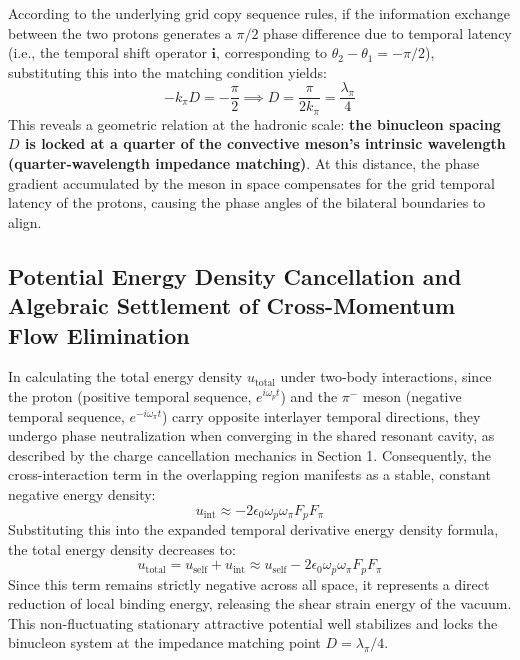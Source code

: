 \documentclass[12pt, a4paper]{article}
\begin{document}
According to the underlying grid copy sequence rules, if the information exchange between the two protons generates a $\pi/2$ phase difference due to temporal latency (i.e., the temporal shift operator $\mathbf{i}$, corresponding to $\theta_2 - \theta_1 = -\pi/2$), substituting this into the matching condition yields:
\begin{equation}
-k_\pi D = -\frac{\pi}{2} \implies D = \frac{\pi}{2 k_\pi} = \frac{\lambda_\pi}{4}
\end{equation}
This reveals a geometric relation at the hadronic scale: \textbf{the binucleon spacing $D$ is locked at a quarter of the convective meson's intrinsic wavelength (quarter-wavelength impedance matching)}. At this distance, the phase gradient accumulated by the meson in space compensates for the grid temporal latency of the protons, causing the phase angles of the bilateral boundaries to align.

\subsection{Potential Energy Density Cancellation and Algebraic Settlement of Cross-Momentum Flow Elimination}

In calculating the total energy density $u_{\mathrm{total}}$ under two-body interactions, since the proton (positive temporal sequence, $e^{i\omega_p t}$) and the $\pi^-$ meson (negative temporal sequence, $e^{-i\omega_\pi t}$) carry opposite interlayer temporal directions, they undergo phase neutralization when converging in the shared resonant cavity, as described by the charge cancellation mechanics in Section 1. Consequently, the cross-interaction term in the overlapping region manifests as a stable, constant negative energy density:
\begin{equation}
u_{\mathrm{int}} \approx - 2 \epsilon_0 \omega_p \omega_\pi F_p F_\pi
\end{equation}
Substituting this into the expanded temporal derivative energy density formula, the total energy density decreases to:
\begin{equation}
u_{\mathrm{total}} = u_{\mathrm{self}} + u_{\mathrm{int}} \approx u_{\mathrm{self}} - 2 \epsilon_0 \omega_p \omega_\pi F_p F_\pi
\end{equation}
Since this term remains strictly negative across all space, it represents a direct reduction of local binding energy, releasing the shear strain energy of the vacuum. This non-fluctuating stationary attractive potential well stabilizes and locks the binucleon system at the impedance matching point $D = \lambda_\pi/4$.
\end{document}
